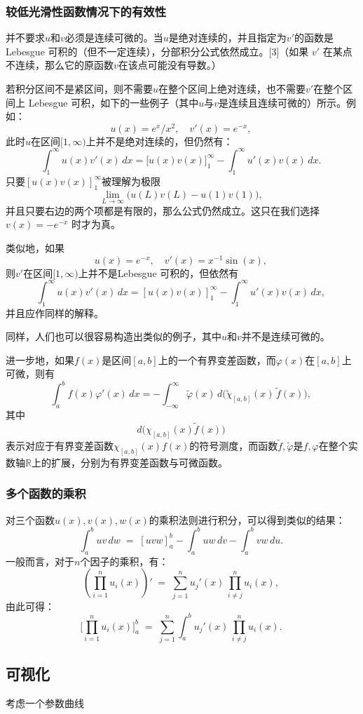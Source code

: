 \subsubsection{较低光滑性函数情况下的有效性}
并不要求$u$和$v$必须是连续可微的。当$u$是绝对连续的，并且指定为$v'$的函数是Lebesgue 可积的（但不一定连续），分部积分公式依然成立。[3]（如果 $v'$ 在某点不连续，那么它的原函数$v$在该点可能没有导数。）

若积分区间不是紧区间，则不需要$u$在整个区间上绝对连续，也不需要$v'$在整个区间上 Lebesgue 可积，如下的一些例子（其中$u$与$v$是连续且连续可微的）所示。例如：
$$
u(x) = e^x/x^2, \quad v'(x) = e^{-x},~
$$
此时$u$在区间$[1,\infty)$上并不是绝对连续的，但仍然有：
$$
\int_{1}^{\infty} u(x)v'(x)\,dx 
= \Big[u(x)v(x)\Big]_{1}^{\infty} - \int_{1}^{\infty} u'(x)v(x)\,dx .~
$$
只要$[u(x)v(x)]_{1}^{\infty}$被理解为极限
$$
\lim_{L \to \infty} \big(u(L)v(L) - u(1)v(1)\big),~
$$
并且只要右边的两个项都是有限的，那么公式仍然成立。这只在我们选择$v(x) = -e^{-x}$
时才为真。

类似地，如果
$$
u(x) = e^{-x}, \quad v'(x) = x^{-1}\sin(x),~
$$
则$v'$在区间$[1,\infty)$上并不是Lebesgue 可积的，但依然有
$$
\int_{1}^{\infty} u(x)v'(x)\,dx = [u(x)v(x)]_{1}^{\infty} - \int_{1}^{\infty} u'(x)v(x)\,dx,~
$$
并且应作同样的解释。

同样，人们也可以很容易构造出类似的例子，其中$u$和$v$并不是连续可微的。

进一步地，如果$f(x)$是区间$[a,b]$上的一个有界变差函数，而$\varphi(x)$在$[a,b]$上可微，则有
$$
\int_{a}^{b} f(x)\varphi'(x)\,dx = -\int_{-\infty}^{\infty} \widetilde{\varphi}(x)\, d\big(\widetilde{\chi}_{[a,b]}(x)\,\widetilde{f}(x)\big),~
$$
其中
$$
d\big(\chi_{[a,b]}(x)\widetilde{f}(x)\big)~
$$
表示对应于有界变差函数$\chi_{[a,b]}(x)f(x)$的符号测度，而函数$\widetilde{f}, \widetilde{\varphi}$是$f, \varphi$在整个实数轴$\mathbb{R}$上的扩展，分别为有界变差函数与可微函数。
\subsubsection{多个函数的乘积}
对三个函数$u(x), v(x), w(x)$的乘积法则进行积分，可以得到类似的结果：
$$
\int_{a}^{b} uv\,dw \;=\; [uvw]_{a}^{b} - \int_{a}^{b} uw\,dv - \int_{a}^{b} vw\,du.~
$$
一般而言，对于$n$个因子的乘积，有：
$$
\left(\prod_{i=1}^{n} u_i(x)\right)' \;=\; \sum_{j=1}^{n} u_j'(x)\,\prod_{i \neq j}^{n} u_i(x),~
$$
由此可得：
$$
\Bigg[\prod_{i=1}^{n} u_i(x)\Bigg]_{a}^{b} \;=\; \sum_{j=1}^{n} \int_{a}^{b} u_j'(x)\,\prod_{i \neq j}^{n} u_i(x).~
$$
\subsection{可视化}
考虑一个参数曲线

